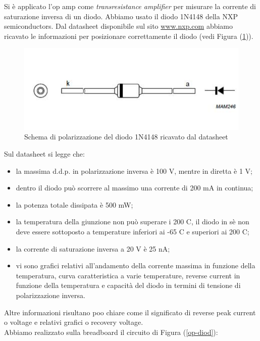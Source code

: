 \documentclass[journal, a4paper]{IEEEtran}
\begin{document}
Si è applicato l'op amp come \textit{transresistance amplifier} per misurare la corrente di saturazione inversa di un diodo. Abbiamo usato il diodo 1N4148 della NXP semiconductors. Dal datasheet disponibile sul sito \url{www.nxp.com} abbiamo ricavato le informazioni per posizionare correttamente il diodo (vedi Figura (\ref{diodo})).

\begin{figure}[htp]
\centering
\includegraphics[scale=.45]{dido}
\caption{Schema di polarizzazione del diodo 1N4148 ricavato dal datasheet}
\label{diodo}
\end{figure}


Sul datasheet si legge che:

\begin{itemize}
\item la massima d.d.p. in polarizzazione inversa è 100 V, mentre in diretta è 1 V;
\item dentro il diodo può scorrere al massimo una corrente di 200 mA in continua;
\item la potenza totale dissipata è 500 mW;
\item la temperatura della giunzione non può superare i 200 C, il diodo in sè non deve essere sottoposto a temperature inferiori ai -65 C e superiori ai 200 C;
\item la corrente di saturazione inversa a 20 V è 25 nA;
\item vi sono grafici relativi all'andamento della corrente massima in funzione della temperatura, curva caratteristica a varie temperature, reverse current in funzione della temperatura e capacità del diodo in termini di tensione di polarizzazione inversa.\\
\end{itemize}

Altre informazioni risultano poo chiare come il significato di reverse peak current o voltage e relativi grafici o recovery voltage.\\
Abbiamo realizzato sulla breadboard il circuito di Figura (\ref{op-diod}):\\
\end{document}
